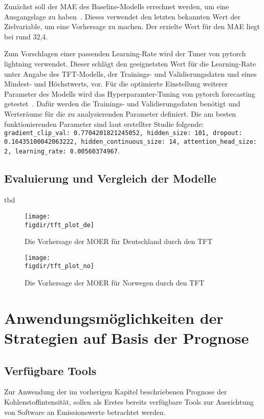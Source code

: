 Zunächst soll der \ac{MAE} des Baseline-Modells errechnet werden, um eine Ausgangslage zu haben~\cite{PytorchForecastingDocumentation.20230410T20:05:46.000Zb}.
Dieses verwendet den letzten bekannten Wert der Zielvariable, um eine Vorhersage zu machen.
Der erzielte Wert für den \ac{MAE} liegt bei rund 32,4.

Zum Vorschlagen einer passenden Learning-Rate wird der Tuner von pytorch lightning verwendet.
Dieser schlägt den geeignetsten Wert für die Learning-Rate unter Angabe des \ac{TFT}-Modells, der Trainings- und Validierungsdaten und eines Mindest- und Höchstwerts, vor.
Für die optimierte Einstellung weiterer Parameter des Modells wird das Hyperparamter-Tuning von pytorch forecasting getestet~\cite{PytorchForecastingDocumentation.20230410T20:05:46.000Z}.
Dafür werden die Trainings- und Validierungsdaten benötigt und Werteräume für die zu analysierenden Parameter definiert.
Die am besten funktionierenden Parameter sind laut erstellter Studie folgende:
\lstinline[columns=fixed]{gradient_clip_val: 0.7704201821245052, hidden_size: 101, dropout: 0.16435100042063222, hidden_continuous_size: 14, attention_head_size: 2, learning_rate: 0.00560374967}.


\section{Evaluierung und Vergleich der Modelle}
tbd

\begin{figure}
 \caption{Die Vorhersage der MOER für Deutschland durch den TFT}
 {\texttt{[image: \\figdir/tft\_plot\_de]}}
 \label{FIG:}
\end{figure}

\begin{figure}
 \caption{Die Vorhersage der MOER für Norwegen durch den TFT}
 {\texttt{[image: \\figdir/tft\_plot\_no]}}
 \label{FIG:}
\end{figure}
\chapter{Anwendungsmöglichkeiten der Strategien auf Basis der Prognose}
\section{Verfügbare Tools}\label{CAP:tools}
Zur Anwendung der im vorherigen Kapitel beschriebenen Prognose der Kohlenstoffintensität, sollen als Erstes bereits verfügbare Tools zur Ausrichtung von Software an Emissionswerte betrachtet werden.

